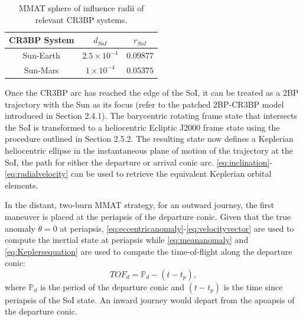 \begin{table}[ht]
    \centering
    \caption{MMAT sphere of influence radii of relevant CR3BP systems.}
    \begin{tabular}{|c|c|c|}
        \hline
        \textbf{CR3BP System}   &   \boldmath$d_{SoI}$  &   \boldmath$r_{SoI}$  \\  \hline
        Sun-Earth               &   $2.5\times10^{-4}$  &   $0.09877$           \\  \hline
        Sun-Mars                &   $1\times10^{-4}$    &   $0.05375$           \\  \hline
    \end{tabular}
    \label{tab:SoI}
\end{table}

Once the CR3BP arc has reached the edge of the SoI, it can be treated as a 2BP trajectory with the
Sun as its focus (refer to the patched 2BP-CR3BP model introduced in Section 2.4.1). The
barycentric rotating frame state that intersects the SoI is transformed to a heliocentric Ecliptic
J2000 frame state using the procedure outlined in Section 2.5.2. The resulting state now defines a
Keplerian heliocentric ellipse in the instantaneous plane of motion of the trajectory at the SoI,
the path for either the departure or arrival conic arc.
\cref{eq:inclination}-\cref{eq:radialvelocity} can be used to retrieve the equivalent Keplerian
orbital elements.

In the distant, two-burn MMAT strategy, for an outward journey, the first maneuver is placed at
the periapsis of the departure conic. Given that the true anomaly $\theta=0$ at periapsis,
\cref{eq:eccentricanomaly}-\cref{eq:velocityvector} are used to compute the inertial state at
periapsis while \cref{eq:meananomaly} and \cref{eq:Keplersequation} are used to compute the
time-of-flight along the departure conic:
\begin{equation}
    TOF_{d}=\mathbb{P}_{d}-(t-t_{p}),
    \label{eq:departureTOF}
\end{equation}
where $\mathbb{P}_{d}$ is the period of the departure conic and $(t-t_{p})$ is the time since
periapsis of the SoI state. An inward journey would depart from the apoapsis of the departure
conic.

